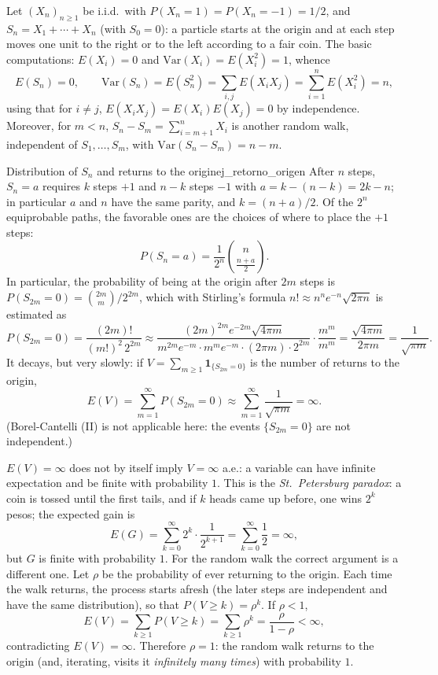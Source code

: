 \documentclass[11pt, a4paper]{article}
\begin{document}
Let $(X_n)_{n \ge 1}$ be i.i.d.\ with $P(X_n = 1) = P(X_n = -1) = 1/2$, and $S_n = X_1 + \cdots +
X_n$ (with $S_0 = 0$): a particle starts at the origin and at each step moves one unit to the
right or to the left according to a fair coin. The basic computations: $E(X_i) = 0$ and
$\mathrm{Var}(X_i) = E(X_i^2) = 1$, whence
$$ E(S_n) = 0, \qquad \mathrm{Var}(S_n) = E(S_n^2) = \sum_{i,j} E(X_i X_j) = \sum_{i=1}^n
E(X_i^2) = n, $$
using that for $i \ne j$, $E(X_i X_j) = E(X_i) E(X_j) = 0$ by independence. Moreover, for
$m < n$, $S_n - S_m = \sum_{i = m+1}^n X_i$ is another random walk, independent of
$S_1, \dots, S_m$, with $\mathrm{Var}(S_n - S_m) = n - m$.

\begin{ejemplo}{Distribution of $S_n$ and returns to the origin}{ej_retorno_origen}
After $n$ steps, $S_n = a$ requires $k$ steps $+1$ and $n - k$ steps $-1$ with $a = k - (n - k) =
2k - n$; in particular $a$ and $n$ have the same parity, and $k = (n + a)/2$. Of the $2^n$
equiprobable paths, the favorable ones are the choices of where to place the $+1$ steps:
$$ P(S_n = a) = \frac{1}{2^n} \binom{n}{\frac{n+a}{2}}. $$
In particular, the probability of being at the origin after $2m$ steps is $P(S_{2m} = 0) =
\binom{2m}{m} / 2^{2m}$, which with Stirling's formula $n! \approx n^n e^{-n} \sqrt{2 \pi n}$
is estimated as
$$ P(S_{2m} = 0) = \frac{(2m)!}{(m!)^2 \, 2^{2m}} \approx
\frac{(2m)^{2m} e^{-2m} \sqrt{4 \pi m}}{m^{2m} e^{-m} \cdot m^{m} e^{-m} \cdot (2 \pi m) \cdot
2^{2m}} \cdot \frac{m^{m}}{m^{m}} = \frac{\sqrt{4 \pi m}}{2 \pi m} = \frac{1}{\sqrt{\pi m}}. $$
It decays, but very slowly: if $V = \sum_{m \ge 1} \mathbf{1}_{\{S_{2m} = 0\}}$ is the number
of returns to the origin,
$$ E(V) = \sum_{m=1}^\infty P(S_{2m} = 0) \approx \sum_{m=1}^\infty \frac{1}{\sqrt{\pi m}} =
\infty. $$
(Borel-Cantelli (II) is not applicable here: the events $\{S_{2m} = 0\}$ are not
independent.)
\end{ejemplo}

\obs $E(V) = \infty$ does not by itself imply $V = \infty$ a.e.: a variable can have
infinite expectation and be finite with probability $1$. This is the \emph{St.\ Petersburg
paradox}: a coin is tossed until the first tails, and if $k$ heads came up before, one wins
$2^k$ pesos; the expected gain is
$$ E(G) = \sum_{k=0}^\infty 2^k \cdot \frac{1}{2^{k+1}} = \sum_{k=0}^\infty \frac{1}{2} =
\infty, $$
but $G$ is finite with probability $1$. For the random walk the correct argument is a different one. Let
$\rho$ be the probability of ever returning to the origin. Each time the walk returns, the
process starts afresh (the later steps are independent and have the same
distribution), so that $P(V \ge k) = \rho^k$. If $\rho < 1$,
$$ E(V) = \sum_{k \ge 1} P(V \ge k) = \sum_{k \ge 1} \rho^k = \frac{\rho}{1 - \rho} < \infty, $$
contradicting $E(V) = \infty$. Therefore $\rho = 1$: the random walk returns to the origin (and,
iterating, visits it \emph{infinitely many times}) with probability $1$.
\end{document}
